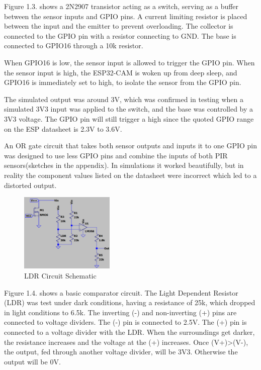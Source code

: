 \documentclass[class=report,11pt,crop=false]{standalone}
\begin{document}
Figure 1.3. shows a 2N2907 transistor acting as a switch, serving as a buffer between the sensor inputs and GPIO pins. A current limiting resistor is placed between the input and the emitter to prevent overloading. The collector is connected to the GPIO pin with a resistor connecting to GND. The base is connected to GPIO16 through a 10k resistor. 

When GPIO16 is low, the sensor input is allowed to trigger the GPIO pin. When the sensor input is high, the ESP32-CAM is woken up from deep sleep, and GPIO16 is immediately set to high, to isolate the sensor from the GPIO pin. 

The simulated output was around 3V, which was confirmed in testing when a simulated 3V3 input was applied to the switch, and the base was controlled by a 3V3 voltage. The GPIO pin will still trigger a high since the quoted GPIO range on the ESP datasheet is 2.3V to 3.6V. 

An OR gate circuit that takes both sensor outputs and inputs it to one GPIO pin was designed to use less GPIO pins and combine the inputs of both PIR sensors(sketches in the appendix). In simulations it worked beautifully, but in reality the component values listed on the datasheet were incorrect which led to a distorted output. 

\begin{figure}[ht]
\centering
\includegraphics[width=0.4\textwidth]{Images/LDR_circuit.png}
\caption{LDR Circuit Schematic}
\label{fig:my_label5}
\end{figure}

Figure 1.4. shows a basic comparator circuit. The Light Dependent Resistor (LDR) was test under dark conditions, having a resistance of 25k, which dropped in light conditions to 6.5k. The inverting (-) and non-inverting (+) pins are connected to voltage dividers. The (-) pin is connected to 2.5V. The (+) pin is connected to a voltage divider with the LDR. When the surroundings get darker, the resistance increases and the voltage at the (+) increases. Once (V+)>(V-), the output, fed through another voltage divider, will be 3V3. Otherwise the output will be 0V. 
\end{document}

